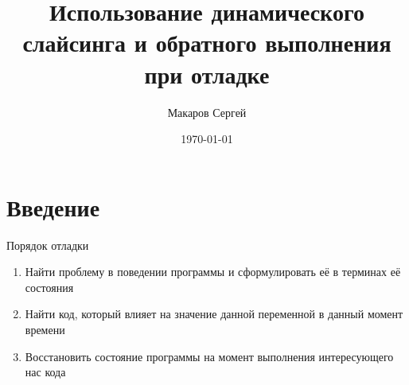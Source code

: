 \documentclass[presentation]{beamer}
\author{Макаров Сергей}
\date{\today}
\title{Использование динамического слайсинга и обратного выполнения при отладке}
\begin{document}
\maketitle

\section{Введение}
\label{sec:orgdb93891}
\begin{frame}[label={sec:orgc63c627}]{Порядок отладки}
\begin{enumerate}
\item Найти проблему в поведении программы и сформулировать её в терминах её состояния
\item Найти код, который влияет на значение данной переменной в данный момент времени
\item Восстановить состояние программы на момент выполнения интересующего нас кода
\end{enumerate}
\end{frame}
\end{document}

